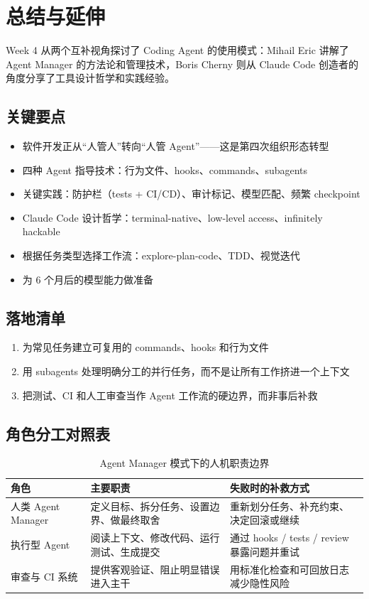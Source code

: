 \section{总结与延伸}

Week 4 从两个互补视角探讨了 Coding Agent 的使用模式：Mihail Eric 讲解了 Agent Manager 的方法论和管理技术，Boris Cherny 则从 Claude Code 创造者的角度分享了工具设计哲学和实践经验。

\subsection{关键要点}

\begin{itemize}
    \item 软件开发正从``人管人''转向``人管 Agent''——这是第四次组织形态转型
    \item 四种 Agent 指导技术：行为文件、hooks、commands、subagents
    \item 关键实践：防护栏（tests + CI/CD）、审计标记、模型匹配、频繁 checkpoint
    \item Claude Code 设计哲学：terminal-native、low-level access、infinitely hackable
    \item 根据任务类型选择工作流：explore-plan-code、TDD、视觉迭代
    \item 为 6 个月后的模型能力做准备
\end{itemize}

\subsection{落地清单}

\begin{enumerate}
    \item 为常见任务建立可复用的 commands、hooks 和行为文件
    \item 用 subagents 处理明确分工的并行任务，而不是让所有工作挤进一个上下文
    \item 把测试、CI 和人工审查当作 Agent 工作流的硬边界，而非事后补救
\end{enumerate}

\subsection{角色分工对照表}

\begin{table}[H]
\centering
\begin{tabular}{p{} p{} p{}}
\toprule
角色 & 主要职责 & 失败时的补救方式 \\
\midrule
人类 Agent Manager & 定义目标、拆分任务、设置边界、做最终取舍 & 重新划分任务、补充约束、决定回滚或继续 \\
执行型 Agent & 阅读上下文、修改代码、运行测试、生成提交 & 通过 hooks / tests / review 暴露问题并重试 \\
审查与 CI 系统 & 提供客观验证、阻止明显错误进入主干 & 用标准化检查和可回放日志减少隐性风险 \\
\bottomrule
\end{tabular}
\caption{Agent Manager 模式下的人机职责边界}
\end{table}

